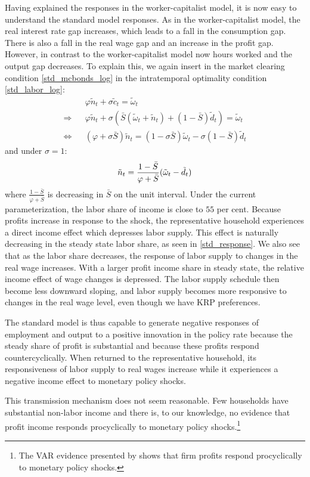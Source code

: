 Having explained the responses in the worker-capitalist model, it is now easy to understand the standard model responses. As in the worker-capitalist model, the real interest rate gap increases, which leads to a fall in the consumption gap. There is also a fall in the real wage gap and an increase in the profit gap. However, in contrast to the worker-capitalist model now hours worked and the output gap decreases. To explain this, we again insert in the market clearing condition \eqref{std_mcbonds_log} in the intratemporal optimality condition \eqref{std_labor_log}:
\begin{eqnarray}
&& \varphi \tilde n_t + \sigma \tilde  c_t =  \tilde \omega_t \nonumber\\
\Rightarrow  &&\varphi \tilde  n_t + \sigma \left( \bar S( \tilde \omega_t+ \tilde n_t) + (1-\bar S)\tilde d_t   \right) =  \tilde \omega_t \nonumber \\
\Leftrightarrow && (\varphi+\sigma \bar S)  \tilde n_t = (1-\sigma \bar S) \tilde \omega_t -\sigma (1-\bar S) \tilde d_t \nonumber
\end{eqnarray}
and under $\sigma=1$:  
\begin{eqnarray}
\lb{std_response}
\tilde n_t = \frac{1-\bar S}{\varphi+\bar S}(\tilde \omega_t-\tilde d_t) \nonumber
\end{eqnarray}  
where $\frac{1-\bar S}{\varphi+\bar S}$ is decreasing in $\bar S$ on the unit interval. Under the current parameterization, the labor share of income is close to $55$ per cent. Because profits increase in response to the shock, the representative household experiences a direct income effect which depresses labor supply. This effect is naturally decreasing in the steady state labor share, as seen in \eqref{std_response}. We also see that as the labor share decreases, the response of labor supply to changes in the real wage increases. With a larger profit income share in steady state, the relative income effect of wage changes is depressed. The labor supply schedule then become less downward sloping, and labor supply becomes more responsive to changes in the real wage level, even though we have KRP preferences.  

The standard model is thus capable to generate negative responses of employment and output to a positive innovation in the policy rate because the steady share of profit is substantial and because these profits respond countercyclically. When returned to the representative household, its responsiveness of labor supply to real wages increase while it experiences a negative income effect to monetary policy shocks. 

This transmission mechanism does not seem reasonable. Few households have substantial non-labor income and there is, to our knowledge, no evidence that profit income responds procyclically to monetary policy shocks.\footnote{The VAR evidence presented by \citet{Christiano2005} shows that firm profits respond procyclically to monetary policy shocks.} 





